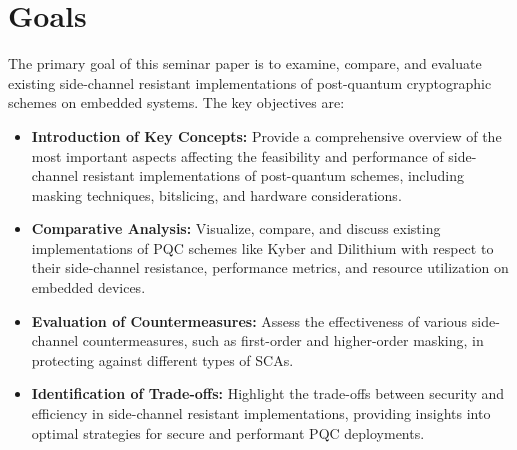 \section{Goals}

The primary goal of this seminar paper is to examine, compare, and evaluate existing side-channel resistant implementations of post-quantum cryptographic schemes on embedded systems. The key objectives are:

\begin{itemize}
    \item \textbf{Introduction of Key Concepts:} Provide a comprehensive overview of the most important aspects affecting the feasibility and performance of side-channel resistant implementations of post-quantum schemes, including masking techniques, bitslicing, and hardware considerations.
    \item \textbf{Comparative Analysis:} Visualize, compare, and discuss existing implementations of PQC schemes like Kyber and Dilithium with respect to their side-channel resistance, performance metrics, and resource utilization on embedded devices.
    \item \textbf{Evaluation of Countermeasures:} Assess the effectiveness of various side-channel countermeasures, such as first-order and higher-order masking, in protecting against different types of SCAs.
    \item \textbf{Identification of Trade-offs:} Highlight the trade-offs between security and efficiency in side-channel resistant implementations, providing insights into optimal strategies for secure and performant PQC deployments.
\end{itemize}
